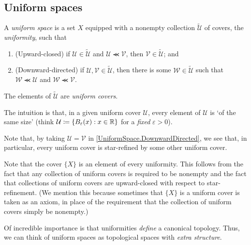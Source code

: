 \subsection{Uniform spaces}

\begin{dfn}\label{UniformSpace}
A \emph{uniform space} is a set $X$ equipped with a nonempty collection $\widetilde{\mathcal{U}}$ of covers, the \emph{uniformity}, such that
\begin{enumerate}
\item \label{UniformSpace.UpwardClosed}(Upward-closed) if $\mathcal{U}\in \widetilde{\mathcal{U}}$ and $\mathcal{U}\llcurly \mathcal{V}$, then $\mathcal{V}\in \widetilde{\mathcal{U}}$; and
\item \label{UniformSpace.DownwardDirected}(Downward-directed) if $\mathcal{U},\mathcal{V}\in \widetilde{\mathcal{U}}$, then there is some $\mathcal{W}\in \widetilde{\mathcal{U}}$ such that $\mathcal{W}\llcurly \mathcal{U}$ and $\mathcal{W}\llcurly \mathcal{V}$.
\end{enumerate}
\begin{rmk}
The elements of $\widetilde{\mathcal{U}}$ are \emph{uniform covers}.
\end{rmk}
\begin{rmk}
The intuition is that, in a given uniform cover $\mathcal{U}$, every element of $\mathcal{U}$ is `of the same size' (think $\mathcal{U}\coloneqq \{ B_{\varepsilon}(x):x\in \mathbb{R} \}$ for a \emph{fixed} $\varepsilon >0$).
\end{rmk}
\begin{rmk}
Note that, by taking $\mathcal{U}=\mathcal{V}$ in \ref{UniformSpace.DownwardDirected}, we see that, in particular, every uniform cover is star-refined by some other uniform cover.
\end{rmk}
\begin{rmk}
Note that the cover $\{ X\}$ is an element of every uniformity.  This follows from the fact that any collection of uniform covers is required to be nonempty and the fact that collections of uniform covers are upward-closed with respect to star-refinement.  (We mention this because sometimes that $\{ X\}$ is a uniform cover is taken as an axiom, in place of the requirement that the collection of uniform covers simply be nonempty.)
\end{rmk}
\end{dfn}
Of incredible importance is that uniformities \emph{define} a canonical topology.  Thus, we can think of uniform spaces as topological spaces with \emph{extra structure}.
